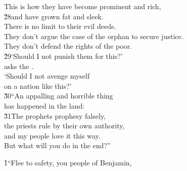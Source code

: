 \begin{poetry}
\poeml This is how they have become prominent and rich, \\
\poeml \v{28}and have grown fat and sleek. \\
\poeml There is no limit to their evil deeds. \\
\poemll    They don't argue the case of the orphan to secure justice. \\
\poemlll       They don't defend the rights of the poor. \\
\poeml \v{29}`Should I not punish them for this?' \\
\poemll    asks the . \\
\poeml `Should I not avenge myself \\
\poemll    on a nation like this?' \\
\poeml \v{30}``An appalling and horrible thing \\
\poemll    has happened in the land: \\
\poeml \v{31}The prophets prophesy falsely, \\
\poemll    the priests rule by their own authority, \\
\poeml and my people love it this way. \\
\poemll    But what will you do in the end?''
\end{poetry}

\v{1}``Flee to safety, you people of Benjamin,

